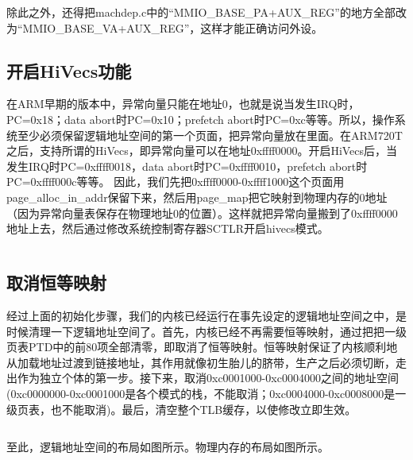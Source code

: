 \documentclass[main.tex]{subfiles}
\begin{document}
\begin{CJK*}{UTF8}{song}
\inputminted[firstline=396,lastline=401,linenos,numbersep=5pt,frame=lines,framesep=2mm]{c}{src/chapter04/kernel/machdep.c}

除此之外，还得把machdep.c中的“MMIO\_BASE\_PA+AUX\_REG”的地方全部改为“MMIO\_BASE\_VA+AUX\_REG”，这样才能正确访问外设。

\subsection{开启HiVecs功能}
在ARM早期的版本中，异常向量只能在地址0，也就是说当发生IRQ时，PC=0x18；data abort时PC=0x10；prefetch abort时PC=0xc等等。所以，操作系统至少必须保留逻辑地址空间的第一个页面，把异常向量放在里面。在ARM720T之后，支持所谓的HiVecs，即异常向量可以在地址0xffff0000。开启HiVecs后，当发生IRQ时PC=0xffff0018，data abort时PC=0xffff0010，prefetch abort时PC=0xffff000c等等。
因此，我们先把0xffff0000-0xffff1000这个页面用page\_alloc\_in\_addr保留下来，然后用page\_map把它映射到物理内存的0地址（因为异常向量表保存在物理地址0的位置）。这样就把异常向量搬到了0xffff0000地址上去，然后通过修改系统控制寄存器SCTLR开启hivecs模式。

\inputminted[firstline=403,lastline=420,linenos,numbersep=5pt,frame=lines,framesep=2mm]{c}{src/chapter04/kernel/machdep.c}

\subsection{取消恒等映射}
经过上面的初始化步骤，我们的内核已经运行在事先设定的逻辑地址空间之中，是时候清理一下逻辑地址空间了。首先，内核已经不再需要恒等映射，通过把把一级页表PTD中的前80项全部清零，即取消了恒等映射。恒等映射保证了内核顺利地从加载地址过渡到链接地址，其作用就像初生胎儿的脐带，生产之后必须切断，走出作为独立个体的第一步。接下来，取消0xc0001000-0xc0004000之间的地址空间(0xc0000000-0xc0001000是各个模式的栈，不能取消；0xc0004000-0xc0008000是一级页表，也不能取消)。最后，清空整个TLB缓存，以使修改立即生效。

\inputminted[firstline=422,lastline=431,linenos,numbersep=5pt,frame=lines,framesep=2mm]{c}{src/chapter04/kernel/machdep.c}

至此，逻辑地址空间的布局如图所示。物理内存的布局如图所示。

\clearpage
\ifxetex\else
\end{CJK*}
\fi
\end{document}
